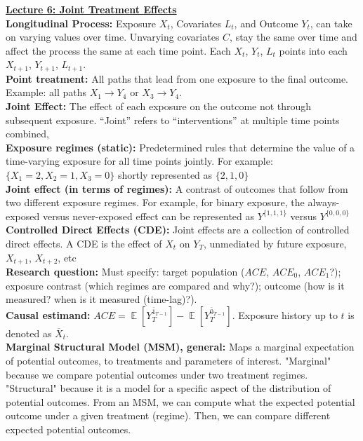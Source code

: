 \documentclass[a4paper,7pt,landscape]{extarticle}
\DeclareMathOperator*{\E}{\mathbb{E}} %
\begin{document}
\begin{multicols}{3}
\begin{boxA}
\underline{\textbf{Lecture 6: Joint Treatment Effects}}\\
\textbf{Longitudinal Process:} Exposure $X_t$, Covariates $L_t$, and Outcome $Y_t$, can take on varying values over time. Unvarying covariates $C$, stay the same over time and affect the process the same at each time point. Each $X_t$, $Y_t$, $L_t$ points into each $X_{t+1}$, $Y_{t+1}$, $L_{t+1}$.\\
\textbf{Point treatment:} All paths that lead from one exposure to the final outcome. Example: all paths $X_1 \rightarrow Y_4$ or $X_3 \rightarrow Y_4$.\\
\textbf{Joint Effect:} The effect of each exposure on the outcome not through subsequent exposure. “Joint” refers to “interventions” at multiple time points combined,\\
\textbf{Exposure regimes (static):} Predetermined rules that determine the value of a time-varying exposure for all time points jointly. For example: $\{X_1 = 2, X_2 = 1, X_3 = 0\}$ shortly represented as $\{2, 1, 0\}$\\
\textbf{Joint effect (in terms of regimes):} A contrast of outcomes that follow from two different exposure regimes. For example, for binary exposure, the always-exposed versus never-exposed effect can be represented as $Y^{\{1, 1, 1\}}$ versus $Y^{\{0, 0, 0\}}$\\
\textbf{Controlled Direct Effects (CDE):} Joint effects are a collection of controlled direct effects. A CDE is the effect of $X_t$ on $Y_T$,
unmediated by future exposure, $X_{t+1}$, $X_{t+2}$, etc\\
\textbf{Research question:} Must specify: target population ($ACE$, $ACE_0$, $ACE_1$?); exposure contrast (which regimes are compared and why?); outcome (how is it measured? when is it measured (time-lag)?).\\
\textbf{Causal estimand:} $ACE = \E [Y_T^{\overline{1}_{T-1}}] - \E [Y_T^{\overline{0}_{T-1}}]$. Exposure history up to $t$ is denoted as $\overline{X}_t$.\\
\textbf{Marginal Structural Model (MSM), general:} Maps a marginal expectation of potential outcomes, to treatments and parameters of interest. "Marginal" because we compare potential outcomes under two treatment regimes. "Structural" because it is a model for a specific aspect of the distribution of potential outcomes. From an MSM, we can compute what the expected potential outcome under a given treatment (regime). Then, we can compare different expected potential outcomes.\\

\end{boxA}
\end{multicols}
\end{document}

